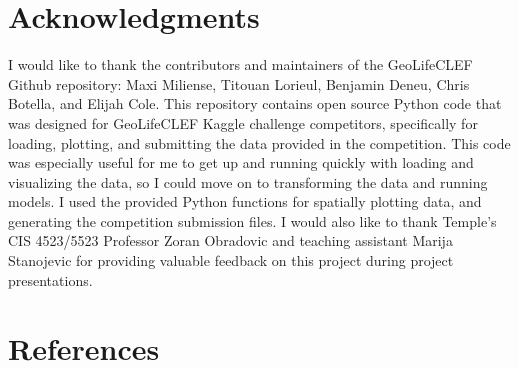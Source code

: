 \documentclass[12pt, oneside]{article}
\begin{document}
\section{Acknowledgments}
\label{Acknowledgments}

\begin{normalsize}

I would like to thank the contributors and maintainers of the GeoLifeCLEF Github repository: Maxi Miliense, Titouan Lorieul, Benjamin Deneu, Chris Botella, and Elijah Cole. This repository contains open source Python code that was designed for GeoLifeCLEF Kaggle challenge competitors, specifically for loading, plotting, and submitting the data provided in the competition. This code was especially useful for me to get up and running quickly with loading and visualizing the data, so I could move on to transforming the data and running models. I used the provided Python functions for spatially plotting data, and generating the competition submission files. I would also like to thank Temple's CIS 4523/5523 Professor Zoran Obradovic and teaching assistant Marija Stanojevic for providing valuable feedback on this project during project presentations.

\end{normalsize}

\section{References}
\label{References}
\nocite{*}
\printbibliography[heading=none]
\end{document}
